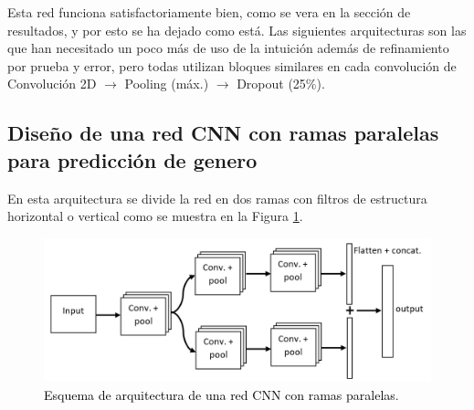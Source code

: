 Esta red funciona satisfactoriamente bien, como se vera en la sección de resultados, y por esto se ha dejado como está. Las siguientes arquitecturas son las que han necesitado un poco más de uso de la intuición además de refinamiento por prueba y error, pero todas utilizan bloques similares en cada convolución de Convolución 2D $\rightarrow$ Pooling (máx.) $\rightarrow$ Dropout (25\%).

\subsection{Diseño de una red CNN con ramas paralelas para predicción de genero}\label{sec:arquitectura_paralela}
\noindent En esta arquitectura se divide la red en dos ramas con filtros de estructura horizontal o vertical como se muestra en la Figura \ref{Fig:parallel_architecture}.

\begin{figure}[htb]
  \centering
  \includegraphics[width=\textwidth]{Figures/parallel_architecture.png}
  \caption{\textcolor{black}{Esquema de arquitectura de una red CNN con ramas paralelas}.}
  \label{Fig:parallel_architecture}
\end{figure}

